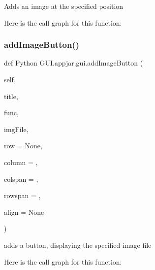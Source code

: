 \begin{DoxyVerb}Adds an image at the specified position \end{DoxyVerb}
 Here is the call graph for this function\+:
\mbox{\label{class_python_01_g_u_i_1_1appjar_1_1gui_a0eade2a8f7633d73bea99e872fce7d1f}} 
\subsubsection{\texorpdfstring{add\+Image\+Button()}{addImageButton()}}
{\footnotesize\ttfamily def Python G\+U\+I.\+appjar.\+gui.\+add\+Image\+Button (\begin{DoxyParamCaption}\item[{}]{self,  }\item[{}]{title,  }\item[{}]{func,  }\item[{}]{img\+File,  }\item[{}]{row = {\ttfamily None},  }\item[{}]{column = {},  }\item[{}]{colspan = {},  }\item[{}]{rowspan = {},  }\item[{}]{align = {\ttfamily None} }\end{DoxyParamCaption})}

\begin{DoxyVerb}adds a button, displaying the specified image file \end{DoxyVerb}
 Here is the call graph for this function\+:
\mbox{\label{class_python_01_g_u_i_1_1appjar_1_1gui_a4f3e0f1fd7a19b00b0794dae152deee8}} 
